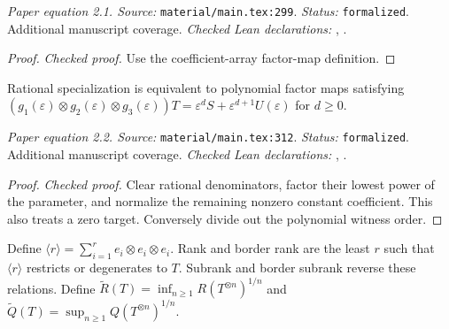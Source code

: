 \noindent\textit{Paper equation 2.1. Source:} \texttt{material/main.tex:299}.
\textit{Status:} \texttt{formalized}. Additional manuscript coverage.
\textit{Checked Lean declarations:} , .

\begin{proof}
\leanok
{}
\textit{Checked proof.} Use the coefficient-array factor-map definition.
\end{proof}

\renewcommand{\thetheorem}{2.2}
\begin{equationresult}
\label{eq:degen-def}
\leanok
Rational specialization is equivalent to polynomial factor maps satisfying $(g_1(\varepsilon)\otimes g_2(\varepsilon)\otimes g_3(\varepsilon))T=\varepsilon^dS+\varepsilon^{d+1}U(\varepsilon)$ for $d\ge0$.
\end{equationresult}

\noindent\textit{Paper equation 2.2. Source:} \texttt{material/main.tex:312}.
\textit{Status:} \texttt{formalized}. Additional manuscript coverage.
\textit{Checked Lean declarations:} , .

\begin{proof}
\leanok
{}
\textit{Checked proof.} Clear rational denominators, factor their lowest power of the parameter, and normalize the remaining nonzero constant coefficient. This also treats a zero target. Conversely divide out the polynomial witness order.
\end{proof}

\renewcommand{\thetheorem}{2.1}
\begin{definition}
\label{def:rank-invariants}
\leanok
{}
Define $\langle r\rangle=\sum_{i=1}^r e_i\otimes e_i\otimes e_i$. Rank and border rank are the least $r$ such that $\langle r\rangle$ restricts or degenerates to $T$. Subrank and border subrank reverse these relations. Define $\widetilde R(T)=\inf_{n\ge1}R(T^{\otimes n})^{1/n}$ and $\widetilde Q(T)=\sup_{n\ge1}Q(T^{\otimes n})^{1/n}$.
\end{definition}

